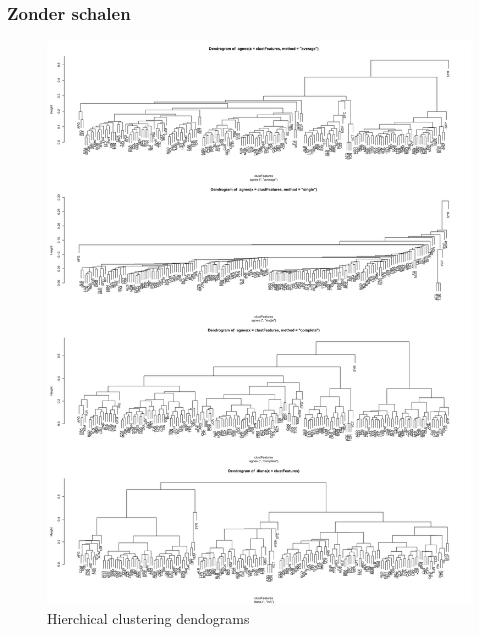 \documentclass[a4paper,kulak]{kulakarticle}
\begin{document}
\subsubsection{Zonder schalen}
\begin{figure}[H]
	\centering
	\includegraphics[height=\textheight]{figures/hierachicalClusteringNoScalingDendogram.jpg}
	\caption{Hierchical clustering dendograms}
	\label{fig:hcnd}
\end{figure}
\end{document}
